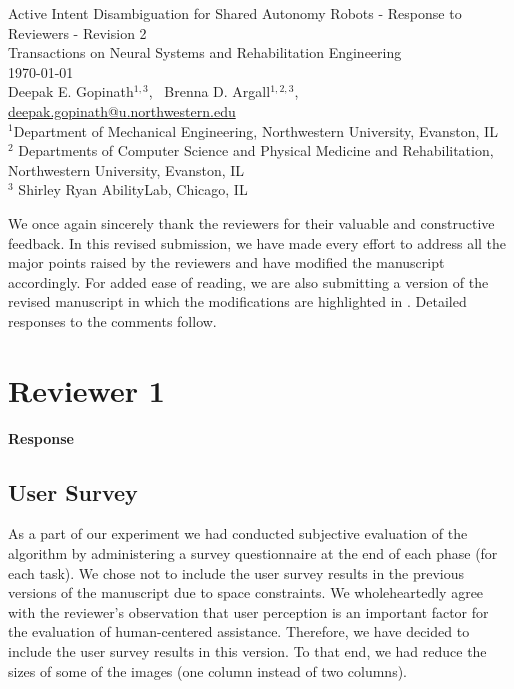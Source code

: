 \documentclass[a4paper,twoside,11pt]{reviewresponse}
\makeatletter
\newcommand{\myAuthors}{{Deepak E. Gopinath$^{\displaystyle 1, 3}$, ~Brenna D. Argall$^{\displaystyle 1,2,3}$, }}
\newcommand{\myEmail}{deepak.gopinath@u.northwestern.edu}
\newcommand{\myTitle}{Active Intent Disambiguation for Shared Autonomy Robots - Response to Reviewers - Revision 2}
\newcommand{\myJournal}{Transactions on Neural Systems and Rehabilitation Engineering}
\newcommand{\myDept}{{$^{\displaystyle 1}$Department of Mechanical Engineering, Northwestern University, Evanston, IL}\\
{$^{\displaystyle 2}$ Departments of Computer Science and Physical Medicine and Rehabilitation, Northwestern University, Evanston, IL  }\\
{$^{\displaystyle 3}$ Shirley Ryan AbilityLab, Chicago, IL }\\}
\makeatother
\begin{document}
\thispagestyle{plain}

\begin{center}
 {\LARGE\myTitle} \vspace{0.5cm} \\
 {\large\myJournal} \vspace{0.5cm} \\
 \today \vspace{0.5cm} \\
 \myAuthors \\
 \url{\myEmail} \vspace{1cm} \\
 \myDept
\end{center}



We once again sincerely thank the reviewers for their valuable and constructive feedback. In this revised submission, we have made every effort to address all the major points raised by the reviewers and have modified the manuscript accordingly. For added ease of reading, we are also submitting a version of the revised manuscript in which the modifications are highlighted in . Detailed responses to the comments follow.  

\section{Reviewer 1}


\textbf{Response}

\subsection{User Survey}
As a part of our experiment we had conducted subjective evaluation of the algorithm by administering a survey questionnaire at the end of each phase (for each task). We chose not to include the user survey results in the previous versions of the manuscript due to space constraints. We wholeheartedly agree with the reviewer's observation that user perception is an important factor for the evaluation of human-centered assistance. Therefore, we have decided to include the user survey results in this version. To that end, we had reduce the sizes of some of the images (one column instead of two columns). 
\end{document}

